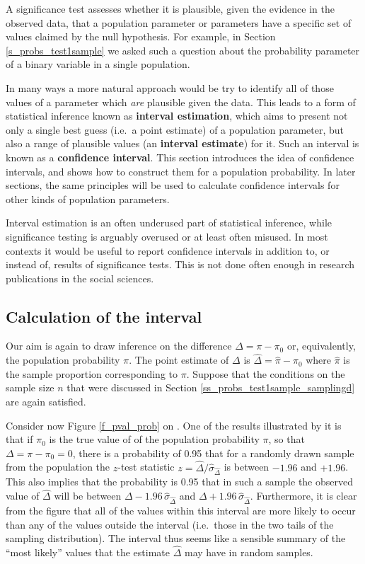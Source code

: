 A significance test assesses whether it is plausible, given the evidence
in the observed data, that a population parameter or parameters have a
specific set of values claimed by the null hypothesis. For example, in Section
\ref{s_probs_test1sample} we asked such a question about the probability
parameter of a binary variable in a single population.

In many ways a
more natural approach would be try to identify all of those values of
a parameter which \emph{are} plausible given the data. This leads to a form
of statistical inference known as \textbf{interval estimation}, which
aims to present not only a single best guess (i.e.\ a point estimate) of
a population parameter, but also a range of plausible values (an
\textbf{interval estimate}) for it. Such an interval is known as a
\textbf{confidence interval}. This section introduces the idea of
confidence intervals, and shows how to construct them for a population
probability. In later sections, the same principles will be used to
calculate confidence intervals for other kinds of population parameters.

Interval estimation is an  often underused part of
statistical inference, while significance testing is arguably overused
or at least often misused. In most contexts it would be useful to report
confidence intervals in addition to, or instead of, results of
significance tests. This is not done often enough in
research publications in the social sciences.

\subsection{Calculation of the interval}
\label{s_probs_1sampleci_calc}

Our aim is again to draw inference on the difference
$\Delta=\pi-\pi_{0}$ or, equivalently, the population probability $\pi$.
The point estimate of $\Delta$ is $\hat{\Delta}=\hat{\pi}-\pi_{0}$ where
$\hat{\pi}$ is the sample proportion corresponding to $\pi$. Suppose
that the conditions on the sample size $n$ that were discussed in
Section \ref{ss_probs_test1sample_samplingd} are again satisfied.

Consider now Figure \ref{f_pval_prob} on \pageref{f_pval_prob}. One of
the results illustrated by it is that if $\pi_{0}$ is the true value of
of the population probability $\pi$, so that $\Delta=\pi-\pi_{0}=0$, there is a
probability of 0.95 that for a randomly drawn sample from the population
the $z$-test statistic $z=\hat{\Delta}/\hat{\sigma}_{\hat{\Delta}}$ is
between $-1.96$ and $+1.96$. This also implies that the probability is
0.95 that in such a sample the observed value of $\hat{\Delta}$ will be
between $\Delta-1.96\,\hat{\sigma}_{\hat{\Delta}}$ and
$\Delta+1.96\,\hat{\sigma}_{\hat{\Delta}}$. Furthermore, it is clear
from the figure that all of the values within this interval are more
likely to occur than any of the values outside the interval (i.e.\ those
in the two tails of the sampling distribution). The interval thus seems
like a sensible summary of the ``most likely'' values that the estimate
$\hat{\Delta}$ may have in random samples.

